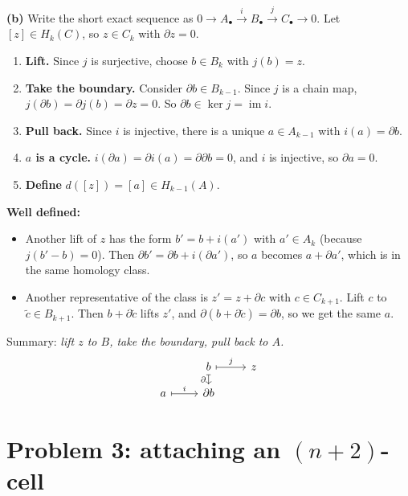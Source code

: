 \documentclass[11pt]{article}
\newcommand{\im}{\operatorname{im}}
\begin{document}
\textbf{(b)} Write the short exact sequence as $0\to A_\bullet\xrightarrow{i}B_\bullet\xrightarrow{j}C_\bullet\to0$. Let $[z]\in H_k(C)$, so $z\in C_k$ with $\partial z=0$.
\begin{enumerate}
\item \textbf{Lift.} Since $j$ is surjective, choose $b\in B_k$ with $j(b)=z$.
\item \textbf{Take the boundary.} Consider $\partial b\in B_{k-1}$. Since $j$ is a chain map, $j(\partial b)=\partial j(b)=\partial z=0$. So $\partial b\in\ker j=\im i$.
\item \textbf{Pull back.} Since $i$ is injective, there is a unique $a\in A_{k-1}$ with $i(a)=\partial b$.
\item \textbf{$a$ is a cycle.} $i(\partial a)=\partial i(a)=\partial\partial b=0$, and $i$ is injective, so $\partial a=0$.
\item \textbf{Define} $d([z])=[a]\in H_{k-1}(A)$.
\end{enumerate}
\textbf{Well defined:}
\begin{itemize}
\item Another lift of $z$ has the form $b'=b+i(a')$ with $a'\in A_k$ (because $j(b'-b)=0$). Then $\partial b'=\partial b+i(\partial a')$, so $a$ becomes $a+\partial a'$, which is in the same homology class.
\item Another representative of the class is $z'=z+\partial c$ with $c\in C_{k+1}$. Lift $c$ to $\tilde c\in B_{k+1}$. Then $b+\partial\tilde c$ lifts $z'$, and $\partial(b+\partial\tilde c)=\partial b$, so we get the same $a$.
\end{itemize}
Summary: \emph{lift $z$ to $B$, take the boundary, pull back to $A$.}
\[\begin{tikzcd}[row sep=small]
 & b \arrow[r,mapsto,"j"]\arrow[d,mapsto,"\partial"'] & z\\
 a\arrow[r,mapsto,"i"] & \partial b &
\end{tikzcd}\]

\section*{Problem 3: attaching an $(n+2)$-cell}
\end{document}
